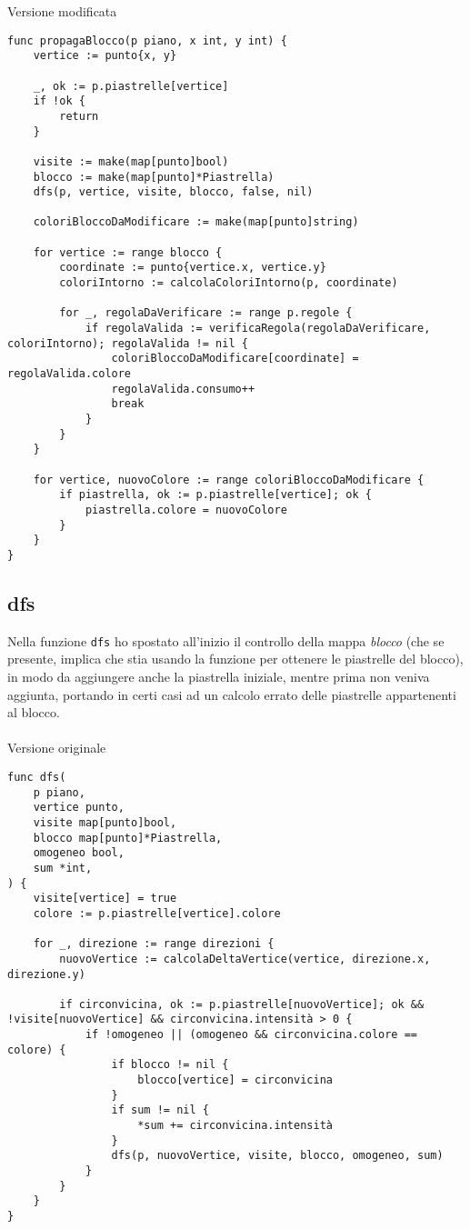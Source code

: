 \documentclass{article}
\begin{document}
Versione modificata
\begin{verbatim}
func propagaBlocco(p piano, x int, y int) {
	vertice := punto{x, y}

	_, ok := p.piastrelle[vertice]
	if !ok {
		return
	}

	visite := make(map[punto]bool)
	blocco := make(map[punto]*Piastrella)
	dfs(p, vertice, visite, blocco, false, nil)

	coloriBloccoDaModificare := make(map[punto]string)

	for vertice := range blocco {
		coordinate := punto{vertice.x, vertice.y}
		coloriIntorno := calcolaColoriIntorno(p, coordinate)

		for _, regolaDaVerificare := range p.regole {
			if regolaValida := verificaRegola(regolaDaVerificare, coloriIntorno); regolaValida != nil {
				coloriBloccoDaModificare[coordinate] = regolaValida.colore
				regolaValida.consumo++
				break
			}
		}
	}

	for vertice, nuovoColore := range coloriBloccoDaModificare {
		if piastrella, ok := p.piastrelle[vertice]; ok {
			piastrella.colore = nuovoColore
		}
	}
}  
\end{verbatim}


\subsection{dfs}
Nella funzione \texttt{dfs} ho spostato all'inizio il controllo della mappa \textit{blocco} (che se presente, implica che stia usando la funzione per ottenere le piastrelle del blocco), in modo da aggiungere anche la piastrella iniziale, mentre prima non veniva aggiunta, portando in certi casi ad un calcolo errato delle piastrelle appartenenti al blocco.
\\ \\
Versione originale
\begin{verbatim}
func dfs(
	p piano,
	vertice punto,
	visite map[punto]bool,
	blocco map[punto]*Piastrella,
	omogeneo bool,
	sum *int,
) {
	visite[vertice] = true
	colore := p.piastrelle[vertice].colore

	for _, direzione := range direzioni {
		nuovoVertice := calcolaDeltaVertice(vertice, direzione.x, direzione.y)

		if circonvicina, ok := p.piastrelle[nuovoVertice]; ok && !visite[nuovoVertice] && circonvicina.intensità > 0 {
			if !omogeneo || (omogeneo && circonvicina.colore == colore) {
				if blocco != nil {
					blocco[vertice] = circonvicina
				}
				if sum != nil {
					*sum += circonvicina.intensità
				}
				dfs(p, nuovoVertice, visite, blocco, omogeneo, sum)
			}
		}
	}
}
  
\end{verbatim}
\end{document}
